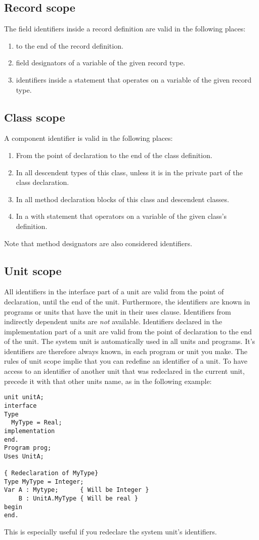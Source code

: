\documentclass{report}
\begin{document}
\subsection{Record scope}
The field identifiers inside a record definition are valid in the following
places:
\begin{enumerate}
\item to the end of the record definition.
\item field designators of a variable of the given record type.
\item identifiers inside a  statement that operates on a variable
of the given record type.
\end{enumerate}
\subsection{Class scope}
A component identifier is valid in the following places:
\begin{enumerate}
\item From the point of declaration to the end of the class definition.
\item In all descendent types of this class, unless it is in the private
part of the class declaration.
\item In all method declaration blocks of this class and descendent classes.
\item In a with statement that operators on a variable of the given class's
definition.
\end{enumerate}
Note that method designators are also considered identifiers.
\subsection{Unit scope}
All identifiers in the interface part of a unit are valid from the point of
declaration, until the end of the unit. Furthermore, the identifiers are
known in programs or units that have the unit in their uses clause.
Identifiers from indirectly dependent units are {\em not} available.
Identifiers declared in the implementation part of a unit are valid from the
point of declaration to the end of the unit.
The system unit is automatically used in all units and programs.
It's identifiers are therefore always known, in each program or unit
you make.
The rules of unit scope implie that you can redefine an identifier of a
unit. To have access to an identifier of another unit that was redeclared in
the current unit, precede it with that other units name, as in the following
example:
\begin{verbatim}
unit unitA;
interface
Type
  MyType = Real;
implementation
end.
Program prog;
Uses UnitA;

{ Redeclaration of MyType}
Type MyType = Integer;
Var A : Mytype;      { Will be Integer }
    B : UnitA.MyType { Will be real }
begin
end.
\end{verbatim}
This is especially useful if you redeclare the system unit's identifiers.
\end{document}
